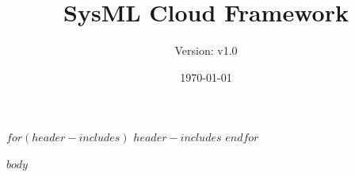 \documentclass[12pt]{article}
\title{SysML Cloud Framework}
\author{Version: v1.0}
\date{\today}
\begin{document}
\maketitle
\thispagestyle{empty}
\clearpage
$for(header-includes)$
$header-includes$
$endfor$

\tableofcontents
\clearpage

$body$
\end{document}
